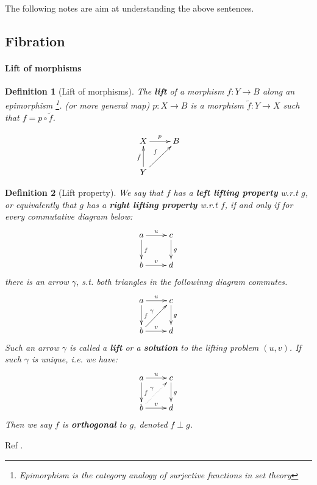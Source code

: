 \documentclass{article}
\numberwithin{equation}{subsection} %
\newtheorem{defi}{Definition}[section]
\theoremstyle{definition}
\begin{document}
    The following notes are aim at understanding the above sentences.

    \subsection{Fibration}
    \label{sec:Fibration}
    \paragraph{Lift of morphisms}
    \begin{defi}[Lift of morphisms]
        The \textbf{lift} of a morphism $f: Y\to B$ along an epimorphism
        \footnote{Epimorphism is the category analogy of surjective
        functions in set theory}. (or more general map) $p:X\to B$ is a
        morphism $\tilde{f}: Y\to X$ such that $f = p\circ\tilde{f}$.
    \end{defi}
    $$
    \xymatrix{
        X\ar[r]^p                    & B \\
        Y\ar[ur]^f\ar[u]^{\tilde{f}} & \\
    }
    $$
    \begin{defi}[Lift property]
        We say that $f$ has a \textbf{left lifting property} w.r.t $g$, or
        equivalently that $g$ has a \textbf{right lifting property} w.r.t
        $f$, if and only if for every commutative diagram below:
        $$
        \xymatrix{
        a\ar[r]^u\ar[d]^f & c\ar[d]^g \\
        b\ar[r]^v         & d
        }
        $$
        there is an arrow $\gamma$, s.t. both triangles in the followinng
        diagram commutes.
        $$ \xymatrix{
        a\ar[r]^u\ar[d]^f         & c\ar[d]^g \\
        b\ar[r]^v\ar[ru]^{\gamma} & d
        }$$
        Such an arrow $\gamma$ is called a \textbf{lift} or a 
        \textbf{solution} to the lifting problem $(u,v)$.
        If such $\gamma$ is unique, i.e. we have:
        $$ \xymatrix{
        a\ar[r]^u\ar[d]^f         & c\ar[d]^g \\
        b\ar[r]^v\ar@{.>}[ru]^{\gamma} & d
        }$$
        Then we say $f$ is \textbf{orthogonal} to $g$, denoted $f \perp g$.
    \end{defi}
    Ref \cite{nlab-lift}.
   
\end{document}
